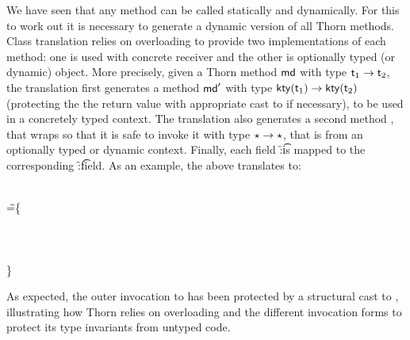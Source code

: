 \documentclass[acmsmall, anonymous, authordraft, review]{acmart} %
\begin{document}
We have seen that any method can be called statically and dynamically. For
this to work out it is necessary to generate a dynamic version of all Thorn
methods.  Class translation relies on overloading to provide two
implementations of each method: one is used with concrete receiver
and the other is
optionally typed (or dynamic) object.  More precisely, given a Thorn method
\(\md\) with type \(\t[1] \to \t[2]\), the \kafka translation first
generates a method \(\mdp\) with type \(\kty{\t[1]} \to \kty{\t[2]}\)
(protecting the the return value with appropriate cast to \kty{\t[2]} if
necessary), to be used in a concretely typed context.  The \kafka
translation also generates a second method \mdpp, that wraps \mdp so that it
is safe to invoke it with type \(\star \to \star\), that is from an optionally
typed or dynamic context.  Finally, each field \f:\t is mapped to the
corresponding \f:\kty\t field.  As an example, the above translates to:

\begin{tabbing}
  \HS
  \KCall{\New \A{}}\n{\SubCast\C{(\KCall{\New\A{}}\m{\SubCast\any{\New\C{}}}\any\any)}}\C\C\
  \\ \HS\HS\HS\HS\HS\HS\HS\HS\HS\HS\HS\HS\HS\HS\HS\HS\HS\HS\HS\HS\HS\HS\HS\HS\HS\HS\HS\HS\HS\HS\HS\HS
\WHERE\HS \K=\HS\=
 \class\= \A \{\\
\>\HS    \Mdef \m\x\any \any{~\x~}\\
\>\HS    \Mdef \n\x\C\C{~\x~}\\
\>\HS    \Mdef \n\x\any\any {\SubCast\any{\KCall\this\n{\SubCast\C\x}\C\C }} \\
\>\}
 \end{tabbing}
\medskip

\noindent As expected, the outer invocation to \n has been protected by a
structural cast to \C, illustrating how Thorn relies on overloading and the
different invocation forms to protect its type invariants from untyped code.


\end{document}
